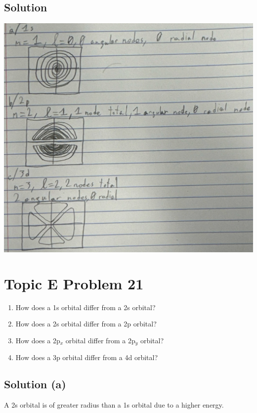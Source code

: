 \documentclass[10pt]{article}
\begin{document}
        \subsection{Solution}
            \begin{center}
                \includegraphics[width=\textwidth]{Answers Images/E21.jpg}
            \end{center}

    \pagebreak
    \section{Topic E Problem 21}
        \begin{enumerate}[label=\alph*)]
            \item   How does a 1s orbital differ from a 2s orbital?
            \item   How does a 2s orbital differ from a 2p orbital?
            \item   How does a 2p$_x$ orbital differ from a 2p$_y$ orbital?
            \item   How does a 3p orbital differ from a 4d orbital?
        \end{enumerate}
        
        \subsection{Solution (a)}
            A 2s orbital is of greater radius than a 1s orbital due to a higher energy.
\end{document}
